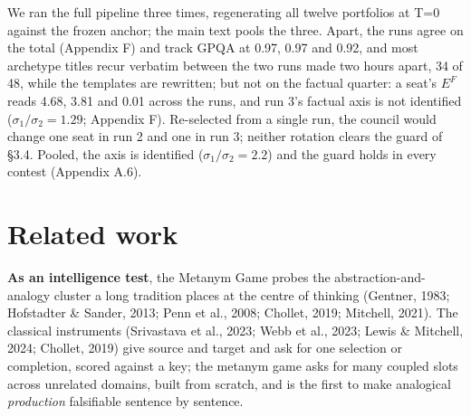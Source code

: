 \documentclass{article}
\begin{document}
We ran the full pipeline three times, regenerating all twelve portfolios at T=0 against the frozen anchor; the main text pools the three. Apart, the runs agree on the total (Appendix F) and track GPQA at 0.97, 0.97 and 0.92, and most archetype titles recur verbatim between the two runs made two hours apart, 34 of 48, while the templates are rewritten; but not on the factual quarter: a seat's \(E^{F}\) reads 4.68, 3.81 and 0.01 across the runs, and run 3's factual axis is not identified (\(\sigma_1/\sigma_2 = 1.29\); Appendix F). Re-selected from a single run, the council would change one seat in run 2 and one in run 3; neither rotation clears the guard of \S{}3.4. Pooled, the axis is identified (\(\sigma_1/\sigma_2 = 2.2\)) and the guard holds in every contest (Appendix A.6).

\section{Related work}\label{related-work}

\textbf{As an intelligence test}, the Metanym Game probes the abstraction-and-analogy cluster a long tradition places at the centre of thinking (Gentner, 1983; Hofstadter \& Sander, 2013; Penn et al., 2008; Chollet, 2019; Mitchell, 2021). The classical instruments (Srivastava et al., 2023; Webb et al., 2023; Lewis \& Mitchell, 2024; Chollet, 2019) give source and target and ask for one selection or completion, scored against a key; the metanym game asks for many coupled slots across unrelated domains, built from scratch, and is the first to make analogical \emph{production} falsifiable sentence by sentence.
\end{document}
